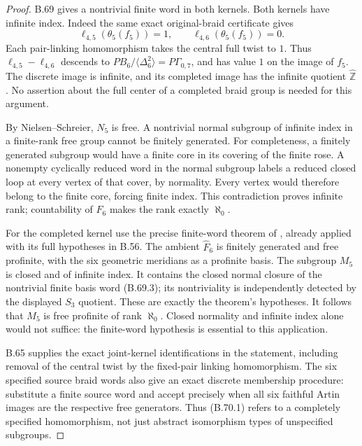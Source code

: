 \begin{proof}
B.69 gives a nontrivial finite word in both kernels.
Both kernels have infinite index.  Indeed the same
exact original-braid certificate gives
\[
       \ell_{4,5}(\theta_5(f_5))=1,
       \qquad \ell_{4,6}(\theta_5(f_5))=0.
                                                               \tag{B.70.2}
\]
Each pair-linking homomorphism takes the central full
twist to $1$.  Thus $\ell_{4,5}-\ell_{4,6}$ descends
to $PB_6/\langle\Delta_6^2\rangle=P\Gamma_{0,7}$,
and has value $1$ on the image of $f_5$.
The discrete image is infinite, and its completed image
has the infinite quotient $\widehat{\mathbb Z}$.
No assertion about the full center of a completed
braid group is needed for this argument.

By Nielsen--Schreier, $N_5$ is free.
A nontrivial normal subgroup of infinite index in
a finite-rank free group cannot be finitely generated.
For completeness, a finitely generated subgroup would
have a finite core in its covering of the finite rose.
A nonempty cyclically reduced word in the normal
subgroup labels a reduced closed loop at every vertex
of that cover, by normality.  Every vertex would
therefore belong to the finite core, forcing finite
index.  This contradiction proves infinite rank;
countability of $F_6$ makes the rank exactly $\aleph_0$.

For the completed kernel use the precise finite-word
theorem of \citet[Theorem~1.2; Corollary~3.7 in the
primary preprint]{DE_Shusterman2016}, already applied
with its full hypotheses in B.56.
The ambient $\widehat F_6$ is finitely generated and
free profinite, with the six geometric meridians as
a profinite basis.
The subgroup $M_5$ is closed and of infinite index.
It contains the closed normal closure of the nontrivial
finite basis word (B.69.3); its nontriviality is
independently detected by the displayed $S_3$ quotient.
These are exactly the theorem's hypotheses.
It follows that $M_5$ is free profinite of rank
$\aleph_0$.  Closed normality and infinite index alone
would not suffice: the finite-word hypothesis is
essential to this application.

B.65 supplies the exact joint-kernel identifications
in the statement, including removal of the central
twist by the fixed-pair linking homomorphism.
The six specified source braid words also give an
exact discrete membership procedure: substitute a
finite source word and accept precisely when all
six faithful Artin images are the respective free
generators.  Thus (B.70.1) refers to a completely
specified homomorphism, not just abstract isomorphism
types of unspecified subgroups.


\end{proof}
